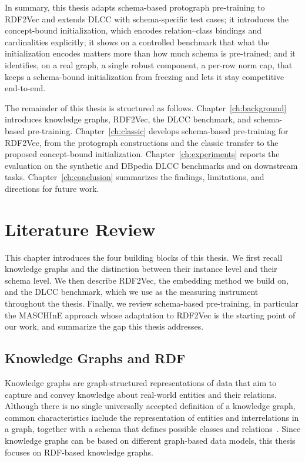 \documentclass[a4paper,oneside,bibliography=totoc]{scrbook}
\begin{document}
In summary, this thesis adapts schema-based protograph pre-training to RDF2Vec
and extends DLCC with schema-specific test cases; it introduces the concept-bound
initialization, which encodes relation--class bindings and cardinalities
explicitly; it shows on a controlled benchmark that what the initialization
encodes matters more than how much schema is pre-trained; and it identifies, on a
real graph, a single robust component, a per-row norm cap, that keeps a
schema-bound initialization from freezing and lets it stay competitive
end-to-end.

The remainder of this thesis is structured as follows.
Chapter~\ref{ch:background} introduces knowledge graphs, RDF2Vec, the DLCC
benchmark, and schema-based pre-training. Chapter~\ref{ch:classic} develops
schema-based pre-training for RDF2Vec, from the protograph constructions and the
classic transfer to the proposed concept-bound initialization.
Chapter~\ref{ch:experiments} reports the evaluation on the synthetic and DBpedia
DLCC benchmarks and on downstream tasks. Chapter~\ref{ch:conclusion} summarizes
the findings, limitations, and directions for future work.

\chapter{Literature Review}
\label{ch:related_work}
\label{ch:background}

This chapter introduces the four building blocks of this thesis. We first
recall knowledge graphs and the distinction between their instance level and
their schema level. We then describe RDF2Vec, the embedding method we build on,
and the DLCC benchmark, which we use as the measuring instrument throughout the
thesis. Finally, we review schema-based pre-training, in particular the
MASCHInE approach whose adaptation to RDF2Vec is the starting point of our
work, and summarize the gap this thesis addresses.

\section{Knowledge Graphs and RDF}
\label{sec:lit_kg}

Knowledge graphs are graph-structured representations of data that aim to
capture and convey knowledge about real-world entities and their relations.
Although there is no single universally accepted definition of a knowledge
graph, common characteristics include the representation of entities and
interrelations in a graph, together with a schema that defines possible classes
and relations~\cite{paulheim_knowledge_2016,hogan_introduction_2022}. Since
knowledge graphs can be based on different graph-based data models, this thesis
focuses on RDF-based knowledge graphs.
\end{document}

